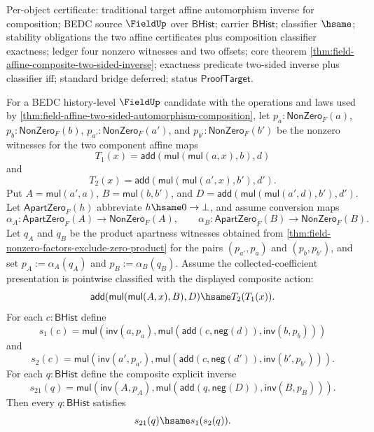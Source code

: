 Per-object certificate: traditional target affine automorphism inverse for
composition; BEDC source $\FieldUp$ over $\mathsf{BHist}$; carrier
$\mathsf{BHist}$; classifier $\hsame$; stability obligations the two affine
certificates plus composition classifier exactness; ledger four nonzero
witnesses and two offsets; core theorem
\autoref{thm:field-affine-composite-two-sided-inverse}; exactness predicate
two-sided inverse plus classifier iff; standard bridge deferred; status
$\mathsf{ProofTarget}$.

\begin{theorem}
\label{thm:field-affine-composite-inverse-reverse-coherence}
For a BEDC history-level $\FieldUp$ candidate with the operations and laws used
by
\autoref{thm:field-affine-two-sided-automorphism-composition}, let
$p_a:\mathsf{NonZero}_F(a)$, $p_b:\mathsf{NonZero}_F(b)$,
$p_{a'}:\mathsf{NonZero}_F(a')$, and $p_{b'}:\mathsf{NonZero}_F(b')$ be the
nonzero witnesses for the two component affine maps
$$
T_1(x)=\mathsf{add}(\mathsf{mul}(\mathsf{mul}(a,x),b),d)
$$
and
$$
T_2(x)=\mathsf{add}(\mathsf{mul}(\mathsf{mul}(a',x),b'),d').
$$
Put
$A=\mathsf{mul}(a',a)$, $B=\mathsf{mul}(b,b')$, and
$D=\mathsf{add}(\mathsf{mul}(\mathsf{mul}(a',d),b'),d')$. Let
$\mathsf{ApartZero}_F(h)$ abbreviate $h\hsame0\to\bot$, and assume conversion
maps
$$
\alpha_A:\mathsf{ApartZero}_F(A)\to\mathsf{NonZero}_F(A),
\qquad
\alpha_B:\mathsf{ApartZero}_F(B)\to\mathsf{NonZero}_F(B).
$$
Let $q_A$ and $q_B$ be the product apartness witnesses obtained from
\autoref{thm:field-nonzero-factors-exclude-zero-product} for the pairs
$(p_{a'},p_a)$ and $(p_b,p_{b'})$, and set $p_A:=\alpha_A(q_A)$ and
$p_B:=\alpha_B(q_B)$. Assume the collected-coefficient presentation is
pointwise classified with the displayed composite action:
$$
\mathsf{add}(\mathsf{mul}(\mathsf{mul}(A,x),B),D)
\hsame
T_2(T_1(x)).
$$
For each
$c:\mathsf{BHist}$ define
$$
s_1(c)=
\mathsf{mul}(\mathsf{inv}(a,p_a),
\mathsf{mul}(\mathsf{add}(c,\mathsf{neg}(d)),\mathsf{inv}(b,p_b)))
$$
and
$$
s_2(c)=
\mathsf{mul}(\mathsf{inv}(a',p_{a'}),
\mathsf{mul}(\mathsf{add}(c,\mathsf{neg}(d')),\mathsf{inv}(b',p_{b'}))).
$$
For each $q:\mathsf{BHist}$ define the composite explicit inverse
$$
s_{21}(q)=
\mathsf{mul}(\mathsf{inv}(A,p_A),
\mathsf{mul}(\mathsf{add}(q,\mathsf{neg}(D)),\mathsf{inv}(B,p_B))).
$$
Then every $q:\mathsf{BHist}$ satisfies
$$
s_{21}(q)\hsame s_1(s_2(q)).
$$
\end{theorem}
